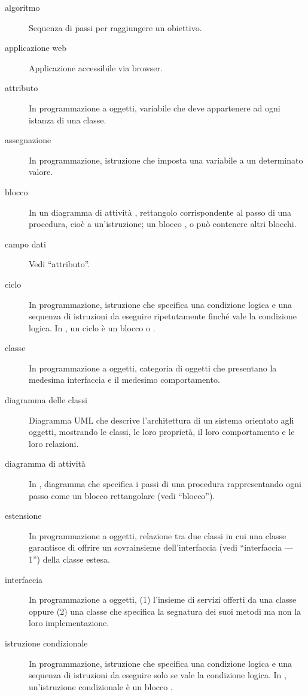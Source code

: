 \begin{description}
	\item[algoritmo] Sequenza di passi per raggiungere un obiettivo.
	\item[applicazione web] Applicazione accessibile via browser.
	\item[attributo] In programmazione a oggetti, variabile che deve appartenere ad ogni istanza di una classe.
	\item[assegnazione] In programmazione, istruzione che imposta una variabile a un determinato valore.
	\item[blocco] In un diagramma di attività \proj, rettangolo corrispondente al passo di una procedura, cioè a un'istruzione; un blocco ,  o  può contenere altri blocchi.
	\item[campo dati] Vedi “attributo”.
	\item[ciclo] In programmazione, istruzione che specifica una condizione logica e una sequenza di istruzioni da eseguire ripetutamente finché vale la condizione logica. In \proj, un ciclo è un blocco  o .
	\item[classe] In programmazione a oggetti, categoria di oggetti che presentano la medesima interfaccia e il medesimo comportamento.
	\item[diagramma delle classi] Diagramma UML che descrive l'architettura di un sistema orientato agli oggetti, mostrando le classi, le loro proprietà, il loro comportamento e le loro relazioni.
	\item[diagramma di attività] In \proj, diagramma che specifica i passi di una procedura rappresentando ogni passo come un blocco rettangolare (vedi “blocco”).
	\item[estensione] In programmazione a oggetti, relazione tra due classi in cui una classe garantisce di offrire un sovrainsieme dell'interfaccia (vedi “interfaccia --- 1”) della classe estesa.
	\item[interfaccia] In programmazione a oggetti, (1) l'insieme di servizi offerti da una classe oppure (2) una classe che specifica la segnatura dei suoi metodi ma non la loro implementazione.
	\item[istruzione condizionale] In programmazione, istruzione che specifica una condizione logica e una sequenza di istruzioni da eseguire solo se vale la condizione logica. In \proj, un'istruzione condizionale è un blocco .

\end{description}
